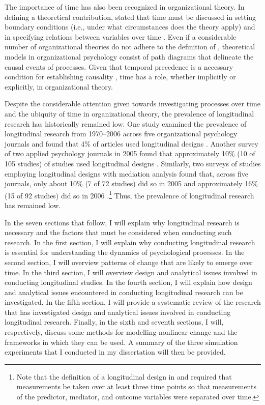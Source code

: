 \documentclass[
12pt, %
twoside,
english]{guelphthesis}
\begin{document}
The importance of time has also been recognized in organizational theory. In defining a theoretical contribution, \textcite{whetten1989} stated that time must be discussed in setting boundary conditions (i.e., under what circumstances does the theory apply) and in specifying relations between variables over time \autocite{mitchell2001,george2000}. Even if a considerable number of organizational theories do not adhere to the definition of \textcite{whetten1989}, theoretical models in organizational psychology consist of path diagrams that delineate the causal events of processes. Given that temporal precedence is a necessary condition for establishing causality \autocite{mill2011}, time has a role, whether implicitly or explicitly, in organizational theory.

Despite the considerable attention given towards investigating processes over time and the ubiquity of time in organizational theory, the prevalence of longitudinal research has historically remained low. One study examined the prevalence of longitudinal research from 1970--2006 across five organizational psychology journals and found that 4\% of articles used longitudinal designs \autocite{roe2014b}. Another survey of two applied psychology journals in 2005 found that approximately 10\% (10 of 105 studies) of studies used longitudinal designs \autocite{roe2008}. Similarly, two surveys of studies employing longitudinal designs with mediation analysis found that, across five journals, only about 10\% (7 of 72 studies) did so in 2005 \autocite{maxwell2007} and approximately 16\% (15 of 92 studies) did so in 2006 \autocite{mitchell2013}.\footnote{Note that the definition of a longitudinal design in \textcite{maxwell2007} and \textcite{mitchell2013} required that measurements be taken over at least three time points so that measurements of the predictor, mediator, and outcome variables were separated over time.} Thus, the prevalence of longitudinal research has remained low.

In the seven sections that follow, I will explain why longitudinal research is necessary and the factors that must be considered when conducting such research. In the first section, I will explain why conducting longitudinal research is essential for understanding the dynamics of psychological processes. In the second section, I will overview patterns of change that are likely to emerge over time. In the third section, I will overview design and analytical issues involved in conducting longitudinal studies. In the fourth section, I will explain how design and analytical issues encountered in conducting longitudinal research can be investigated. In the fifth section, I will provide a systematic review of the research that has investigated design and analytical issues involved in conducting longitudinal research. Finally, in the sixth and seventh sections, I will, respectively, discuss some methods for modelling nonlinear change and the frameworks in which they can be used. A summary of the three simulation experiments that I conducted in my dissertation will then be provided.
\end{document}
